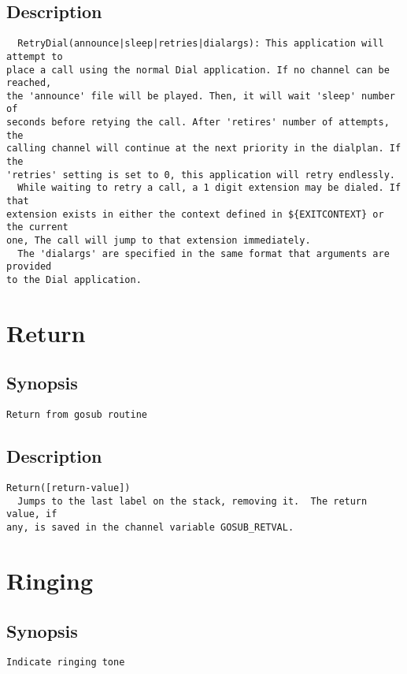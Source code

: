 \subsection{Description}
\begin{verbatim}
  RetryDial(announce|sleep|retries|dialargs): This application will attempt to
place a call using the normal Dial application. If no channel can be reached,
the 'announce' file will be played. Then, it will wait 'sleep' number of
seconds before retying the call. After 'retires' number of attempts, the
calling channel will continue at the next priority in the dialplan. If the
'retries' setting is set to 0, this application will retry endlessly.
  While waiting to retry a call, a 1 digit extension may be dialed. If that
extension exists in either the context defined in ${EXITCONTEXT} or the current
one, The call will jump to that extension immediately.
  The 'dialargs' are specified in the same format that arguments are provided
to the Dial application.

\end{verbatim}


\section{Return}
\subsection{Synopsis}
\begin{verbatim}
Return from gosub routine
\end{verbatim}
\subsection{Description}
\begin{verbatim}
Return([return-value])
  Jumps to the last label on the stack, removing it.  The return value, if
any, is saved in the channel variable GOSUB_RETVAL.

\end{verbatim}


\section{Ringing}
\subsection{Synopsis}
\begin{verbatim}
Indicate ringing tone
\end{verbatim}
